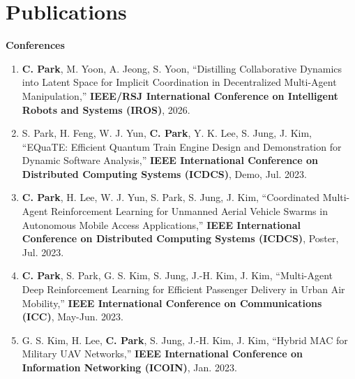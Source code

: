 \documentclass[10.5pt,a4paper]{article}
\begin{document}
\section*{Publications}

\textbf{Conferences}
\begin{enumerate}[leftmargin=1.4em, itemsep=3pt, topsep=2pt]
  \item \textbf{C. Park}, M. Yoon, A. Jeong, S. Yoon, ``Distilling Collaborative Dynamics into Latent Space for Implicit Coordination in Decentralized Multi-Agent Manipulation,'' \textbf{IEEE/RSJ International Conference on Intelligent Robots and Systems (IROS)}, 2026.
  \item S. Park, H. Feng, W. J. Yun, \textbf{C. Park}, Y. K. Lee, S. Jung, J. Kim, ``EQuaTE: Efficient Quantum Train Engine Design and Demonstration for Dynamic Software Analysis,'' \textbf{IEEE International Conference on Distributed Computing Systems (ICDCS)}, Demo, Jul. 2023.
  \item \textbf{C. Park}, H. Lee, W. J. Yun, S. Park, S. Jung, J. Kim, ``Coordinated Multi-Agent Reinforcement Learning for Unmanned Aerial Vehicle Swarms in Autonomous Mobile Access Applications,'' \textbf{IEEE International Conference on Distributed Computing Systems (ICDCS)}, Poster, Jul. 2023.
  \item \textbf{C. Park}, S. Park, G. S. Kim, S. Jung, J.-H. Kim, J. Kim, ``Multi-Agent Deep Reinforcement Learning for Efficient Passenger Delivery in Urban Air Mobility,'' \textbf{IEEE International Conference on Communications (ICC)}, May-Jun. 2023.
  \item G. S. Kim, H. Lee, \textbf{C. Park}, S. Jung, J.-H. Kim, J. Kim, ``Hybrid MAC for Military UAV Networks,'' \textbf{IEEE International Conference on Information Networking (ICOIN)}, Jan. 2023.
\end{enumerate}
\end{document}
